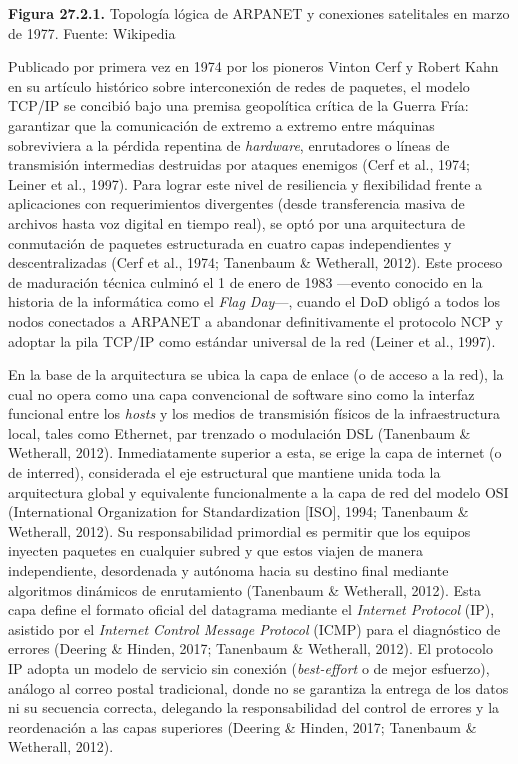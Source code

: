 \textbf{Figura 27.2.1.} Topología lógica de ARPANET y conexiones
satelitales en marzo de 1977. Fuente: Wikipedia

Publicado por primera vez en 1974 por los pioneros Vinton Cerf y Robert
Kahn en su artículo histórico sobre interconexión de redes de paquetes,
el modelo TCP/IP se concibió bajo una premisa geopolítica crítica de la
Guerra Fría: garantizar que la comunicación de extremo a extremo entre
máquinas sobreviviera a la pérdida repentina de \emph{hardware},
enrutadores o líneas de transmisión intermedias destruidas por ataques
enemigos (Cerf et al., 1974; Leiner et al., 1997). Para lograr este
nivel de resiliencia y flexibilidad frente a aplicaciones con
requerimientos divergentes (desde transferencia masiva de archivos hasta
voz digital en tiempo real), se optó por una arquitectura de conmutación
de paquetes estructurada en cuatro capas independientes y
descentralizadas (Cerf et al., 1974; Tanenbaum \& Wetherall, 2012). Este
proceso de maduración técnica culminó el 1 de enero de 1983 ---evento
conocido en la historia de la informática como el \emph{Flag Day}---,
cuando el DoD obligó a todos los nodos conectados a ARPANET a abandonar
definitivamente el protocolo NCP y adoptar la pila TCP/IP como estándar
universal de la red (Leiner et al., 1997).

En la base de la arquitectura se ubica la capa de enlace (o de acceso a
la red), la cual no opera como una capa convencional de software sino
como la interfaz funcional entre los \emph{hosts} y los medios de
transmisión físicos de la infraestructura local, tales como Ethernet,
par trenzado o modulación DSL (Tanenbaum \& Wetherall, 2012).
Inmediatamente superior a esta, se erige la capa de internet (o de
interred), considerada el eje estructural que mantiene unida toda la
arquitectura global y equivalente funcionalmente a la capa de red del
modelo OSI (International Organization for Standardization {[}ISO{]},
1994; Tanenbaum \& Wetherall, 2012). Su responsabilidad primordial es
permitir que los equipos inyecten paquetes en cualquier subred y que
estos viajen de manera independiente, desordenada y autónoma hacia su
destino final mediante algoritmos dinámicos de enrutamiento (Tanenbaum
\& Wetherall, 2012). Esta capa define el formato oficial del datagrama
mediante el \emph{Internet Protocol} (IP), asistido por el
\emph{Internet Control Message Protocol} (ICMP) para el diagnóstico de
errores (Deering \& Hinden, 2017; Tanenbaum \& Wetherall, 2012). El
protocolo IP adopta un modelo de servicio sin conexión
(\emph{best-effort} o de mejor esfuerzo), análogo al correo postal
tradicional, donde no se garantiza la entrega de los datos ni su
secuencia correcta, delegando la responsabilidad del control de errores
y la reordenación a las capas superiores (Deering \& Hinden, 2017;
Tanenbaum \& Wetherall, 2012).

